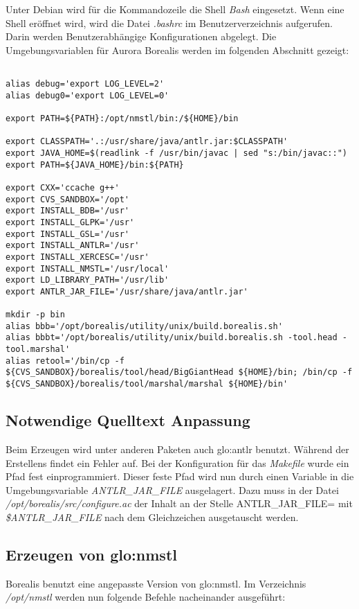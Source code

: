 Unter Debian wird für die Kommandozeile die Shell \textit{Bash} eingesetzt. Wenn eine Shell eröffnet wird, wird die Datei \textit{.bashrc} im Benutzerverzeichnis aufgerufen. Darin werden Benutzerabhängige Konfigurationen abgelegt. Die Umgebungsvariablen für Aurora Borealis werden im folgenden Abschnitt gezeigt:
\begin{verbatim}

alias debug='export LOG_LEVEL=2'
alias debug0='export LOG_LEVEL=0'

export PATH=${PATH}:/opt/nmstl/bin:/${HOME}/bin

export CLASSPATH='.:/usr/share/java/antlr.jar:$CLASSPATH'
export JAVA_HOME=$(readlink -f /usr/bin/javac | sed "s:/bin/javac::")
export PATH=${JAVA_HOME}/bin:${PATH}

export CXX='ccache g++'
export CVS_SANDBOX='/opt'
export INSTALL_BDB='/usr'
export INSTALL_GLPK='/usr'
export INSTALL_GSL='/usr'
export INSTALL_ANTLR='/usr'
export INSTALL_XERCESC='/usr'
export INSTALL_NMSTL='/usr/local'
export LD_LIBRARY_PATH='/usr/lib'
export ANTLR_JAR_FILE='/usr/share/java/antlr.jar'

mkdir -p bin
alias bbb='/opt/borealis/utility/unix/build.borealis.sh'
alias bbbt='/opt/borealis/utility/unix/build.borealis.sh -tool.head -tool.marshal'
alias retool='/bin/cp -f ${CVS_SANDBOX}/borealis/tool/head/BigGiantHead ${HOME}/bin; /bin/cp -f ${CVS_SANDBOX}/borealis/tool/marshal/marshal ${HOME}/bin'
\end{verbatim}


\subsection{Notwendige Quelltext Anpassung}

Beim Erzeugen wird unter anderen Paketen auch \gls{glo:antlr} benutzt. Während der Erstellens findet ein Fehler auf. Bei der Konfiguration für das \textit{Makefile} wurde ein Pfad fest einprogrammiert. Dieser feste Pfad wird nun durch einen Variable in die Umgebungsvariable \textit{ANTLR\_JAR\_FILE} ausgelagert. Dazu muss in der Datei \textit{/opt/borealis/src/configure.ac} der Inhalt an der Stelle ANTLR\_JAR\_FILE= mit \textit{\$ANTLR\_JAR\_FILE} nach dem Gleichzeichen ausgetauscht werden.


\subsection{Erzeugen von \gls{glo:nmstl}}

Borealis benutzt eine angepasste Version von \gls{glo:nmstl}. Im Verzeichnis \textit{/opt/nmstl} werden nun folgende Befehle nacheinander ausgeführt:


